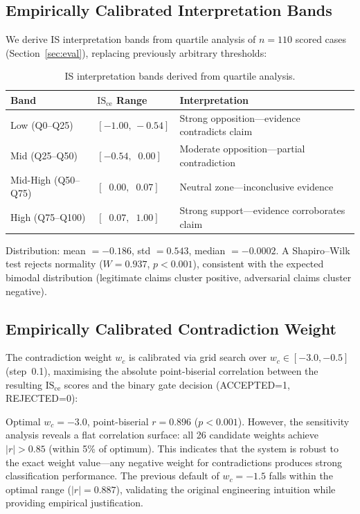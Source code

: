 \documentclass[11pt,a4paper]{article}
\begin{document}
\subsection{Empirically Calibrated Interpretation Bands}\label{sec:bands}

We derive IS interpretation bands from quartile analysis of $n=110$
scored cases (Section~\ref{sec:eval}), replacing previously arbitrary
thresholds:

\begin{table}[ht]
\centering
\caption{IS interpretation bands derived from quartile analysis.}
\label{tab:bands}
\begin{tabular}{@{}llp{5.5cm}@{}}
\toprule
\textbf{Band} & \textbf{$\mathrm{IS_{ce}}$ Range} & \textbf{Interpretation} \\
\midrule
Low (Q0--Q25)      & $[-1.00,\,-0.54]$ & Strong opposition---evidence contradicts claim \\
Mid (Q25--Q50)     & $[-0.54,\;\;0.00]$ & Moderate opposition---partial contradiction \\
Mid-High (Q50--Q75)& $[\;\;0.00,\;\;0.07]$ & Neutral zone---inconclusive evidence \\
High (Q75--Q100)   & $[\;\;0.07,\;\;1.00]$ & Strong support---evidence corroborates claim \\
\bottomrule
\end{tabular}
\end{table}

Distribution: mean $= -0.186$, std $= 0.543$, median $= -0.0002$.
A Shapiro--Wilk test rejects normality ($W = 0.937$, $p < 0.001$),
consistent with the expected bimodal distribution (legitimate claims
cluster positive, adversarial claims cluster negative).

\subsection{Empirically Calibrated Contradiction Weight}\label{sec:weight-cal}

The contradiction weight $w_c$ is calibrated via grid search over
$w_c \in [-3.0, -0.5]$ (step~0.1), maximising the absolute
point-biserial correlation between the resulting $\mathrm{IS_{ce}}$
scores and the binary gate decision (ACCEPTED=1, REJECTED=0):

Optimal $w_c = -3.0$, point-biserial $r = 0.896$ ($p < 0.001$).
However, the sensitivity analysis reveals a flat correlation surface:
all 26 candidate weights achieve $|r| > 0.85$ (within 5\% of
optimum).  This indicates that the system is robust to the exact
weight value---any negative weight for contradictions produces strong
classification performance.  The previous default of $w_c = -1.5$
falls within the optimal range ($|r| = 0.887$), validating the
original engineering intuition while providing empirical
justification.
\end{document}
